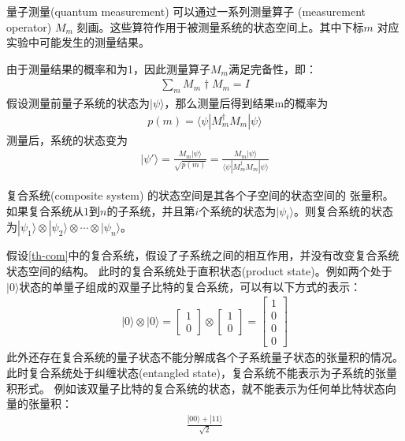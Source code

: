 \begin{theorem}\citep{nielsen2010quantum}
    量子测量(quantum measurement) 可以通过一系列测量算子 (measurement operator) ${M_m}$ 刻画。这些算符作用于被测量系统的状态空间上。其中下标$m$
   对应实验中可能发生的测量结果。
\end{theorem}
由于测量结果的概率和为1，因此测量算子${M_m}$满足完备性，即：
\begin{align}
    \sum_m M_m\dagger M_m = I
\end{align}
假设测量前量子系统的状态为\(|\psi\rangle\)，那么测量后得到结果m的概率为
\begin{align}
    p(m) = \langle\psi|M_m^\dagger M_m|\psi\rangle
\end{align}
测量后，系统的状态变为
\begin{align}
    |\psi'\rangle =  \frac{M_m|\psi\rangle}{\sqrt{p(m)}} = \frac{M_m|\psi\rangle}{\langle\psi|M_m^\dagger M_m|\psi\rangle}
\end{align}
\begin{theorem}\citep{nielsen2010quantum}
    复合系统(composite system) 的状态空间是其各个子空间的状态空间的
    张量积。如果复合系统从$1$到$n$的子系统，并且第$i$个系统的状态为$|\psi_i\rangle$。则复合系统的状态为\(|\psi_1\rangle\otimes|\psi_2\rangle\otimes\cdots\otimes |\psi_n\rangle\)。
    \label{th-com}
\end{theorem}
假设\ref{th-com}中的复合系统，假设了子系统之间的相互作用，并没有改变复合系统状态空间的结构。
此时的复合系统处于直积状态(product state)。例如两个处于\(|0\rangle\)状态的单量子组成的双量子比特的复合系统，可以有以下方式的表示：
\begin{align}
    |0\rangle\otimes|0\rangle=\left[\begin{matrix}
        1\\0
    \end{matrix}\right]\otimes\left[\begin{matrix}
        1\\0
    \end{matrix}\right] = \left[\begin{matrix}
        1\\0\\0\\0
    \end{matrix}\right]
\end{align}
此外还存在复合系统的量子状态不能分解成各个子系统量子状态的张量积的情况。此时复合系统处于纠缠状态(entangled state)，复合系统不能表示为子系统的张量积形式。
例如该双量子比特的复合系统的状态，就不能表示为任何单比特状态向量的张量积：
\begin{align}
    \frac{|00\rangle+|11\rangle}{\sqrt{2}}
\end{align}
